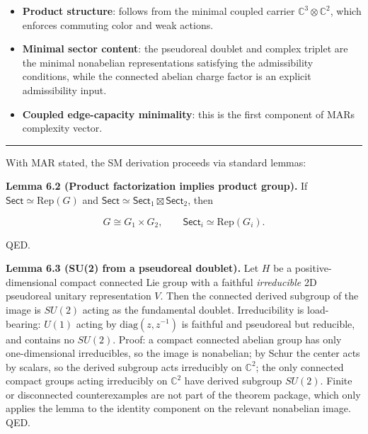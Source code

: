 \begin{itemize}
\tightlist
\item
  \textbf{Product structure}: follows from the minimal coupled carrier \(\mathbb{C}^3 \otimes \mathbb{C}^2\), which enforces commuting color and weak actions.
\item
  \textbf{Minimal sector content}: the pseudoreal doublet and complex triplet are the minimal nonabelian representations satisfying the admissibility conditions, while the connected abelian charge factor is an explicit admissibility input.
\item
  \textbf{Coupled edge-capacity minimality}: this is the first component of MAR\textquotesingle s complexity vector.
\end{itemize}

\begin{center}\rule{0.5\linewidth}{0.5pt}\end{center}

With MAR stated, the SM derivation proceeds via standard lemmas:

\textbf{Lemma 6.2 (Product factorization implies product group).} If \(\mathsf{Sect} \simeq \mathrm{Rep}(G)\) and \(\mathsf{Sect} \simeq \mathsf{Sect}_1 \boxtimes \mathsf{Sect}_2\), then

\[
G \cong G_1 \times G_2,
\qquad
\mathsf{Sect}_i \simeq \mathrm{Rep}(G_i).
\]

QED.

\textbf{Lemma 6.3 (SU(2) from a pseudoreal doublet).} Let \(H\) be a positive-dimensional compact connected Lie group with a faithful \emph{irreducible} 2D pseudoreal unitary representation \(V\). Then the connected derived subgroup of the image is \(SU(2)\) acting as the fundamental doublet. Irreducibility is load-bearing: \(U(1)\) acting by \(\mathrm{diag}(z,z^{-1})\) is faithful and pseudoreal but reducible, and contains no \(SU(2)\). Proof: a compact connected abelian group has only one-dimensional irreducibles, so the image is nonabelian; by Schur the center acts by scalars, so the derived subgroup acts irreducibly on \(\mathbb C^2\); the only connected compact groups acting irreducibly on \(\mathbb C^2\) have derived subgroup \(SU(2)\). Finite or disconnected counterexamples are not part of the theorem package, which only applies the lemma to the identity component on the relevant nonabelian image. QED.

